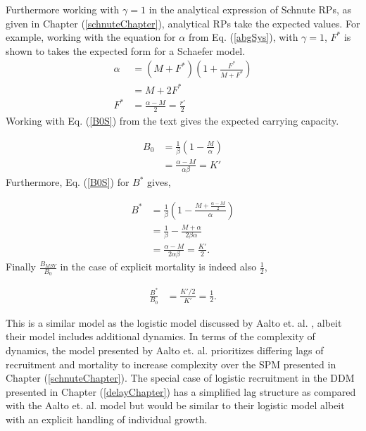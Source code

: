 %
Furthermore working with $\gamma=1$ in the analytical expression of Schnute RPs, 
as given in Chapter (\ref{schnuteChapter}), analytical RPs take the expected 
values. For example, working with the equation for $\alpha$ from Eq. (\ref{abgSys}), 
with $\gamma=1$, $F^*$ is shown to takes the expected form for a Schaefer model.
\begin{align}
\alpha &= (M+F^*)\left(1+\frac{F^*}{M+F^*}\right) \nonumber\\
       &= M+2F^* \nonumber\\
   F^* &= \frac{\alpha-M}{2} = \frac{r'}{2} 
\end{align}
Working with Eq. (\ref{B0S}) from the text gives the expected carrying capacity.

\begin{align}
B_0 &= \frac{1}{\beta} \left( 1-\frac{M}{\alpha} \right) \nonumber\\
    &= \frac{\alpha-M}{\alpha\beta} = K'
\end{align}
Furthermore, Eq. (\ref{B0S}) for $B^*$ gives,

\begin{align}
    B^* &= \frac{1}{\beta} \left( 1-\frac{M+\frac{\alpha-M}{2}}{\alpha}\right) \nonumber\\
        &= \frac{1}{\beta} - \frac{M+\alpha}{2\beta\alpha}\nonumber\\
        &= \frac{\alpha-M}{2\alpha\beta} = \frac{K'}{2}.
\end{align}
%
Finally $\frac{B_{MSY}}{B_0}$ in the case of explicit mortality is indeed also $\frac{1}{2}$,

\begin{align}
\frac{B^*}{B_0}&=\frac{K'/2}{K'}=\frac{1}{2}.
\end{align}

%
This is a similar model as the logistic model discussed by Aalto et. al. \cite{aalto_separating_2015}, 
albeit their model includes additional dynamics. In terms of the complexity of 
dynamics, the model presented by Aalto et. al. prioritizes differing lags of 
recruitment and mortality to increase complexity over the SPM presented in Chapter (\ref{schnuteChapter}). 
The special case of logistic recruitment in the DDM presented in Chapter (\ref{delayChapter}) 
has a simplified lag structure as compared with the Aalto et. al. model but would be similar 
to their logistic model albeit with an explicit handling of individual growth. 
%
%
